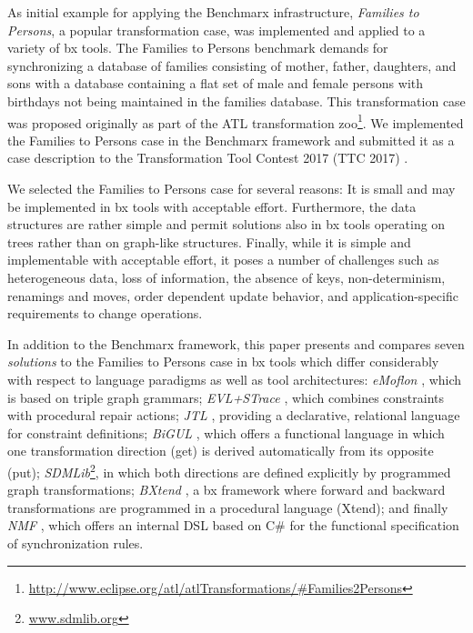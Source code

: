 As initial example for applying the Benchmarx infrastructure, \emph{Families to Persons}, a popular transformation case, was implemented and applied to a variety of bx tools. The Families to Persons benchmark demands for synchronizing a database of families consisting of mother, father, daughters, and sons with a database containing a flat set of male and female persons with birthdays not being maintained in the families database. This transformation case was proposed originally as part of the ATL \cite{SCP-Jouault2008} transformation zoo\footnote{\url{http://www.eclipse.org/atl/atlTransformations/\#Families2Persons}}. We implemented the Families to Persons case in the Benchmarx framework and submitted it as a case description to the Transformation Tool Contest 2017 (TTC 2017) \cite{Anjorin2017a}. 

We selected the Families to Persons case for several reasons: It is small and may be implemented in bx tools with acceptable effort. Furthermore, the data structures are rather simple and permit solutions also in bx tools operating on trees rather than on graph-like structures. Finally, while it is simple and implementable with acceptable effort, it poses a number of challenges such as heterogeneous data, loss of information, the absence of keys, non-determinism, renamings and moves, order dependent update behavior, and application-specific requirements to change operations.


In addition to the Benchmarx framework, this paper presents and compares seven \emph{solutions} to the Families to Persons case in bx tools which differ considerably with respect to language paradigms as well as tool architectures: \emph{eMoflon} \cite{Leblebici2014a}, which is based on triple graph grammars; \emph{EVL+STrace} \cite{IST2018-Samimi}, which combines constraints with procedural repair actions; \emph{JTL} \cite{SLE2010-Cicchetti}, providing a declarative, relational language for constraint definitions; \emph{BiGUL} \cite{PEPM2016-Ko}, which offers a functional language in which one transformation direction (get) is derived automatically from its opposite (put); \emph{SDMLib}\footnote{\url{www.sdmlib.org}}, in which both directions are defined explicitly by programmed graph transformations; \emph{BXtend} \cite{MODELSWARD2018-Buchmann}, a bx framework where forward and backward transformations are programmed in a procedural language (Xtend); and finally \emph{NMF} \cite{SoSyM2017-Hinkel}, which offers an internal DSL based on C\# for the functional specification of synchronization rules.

